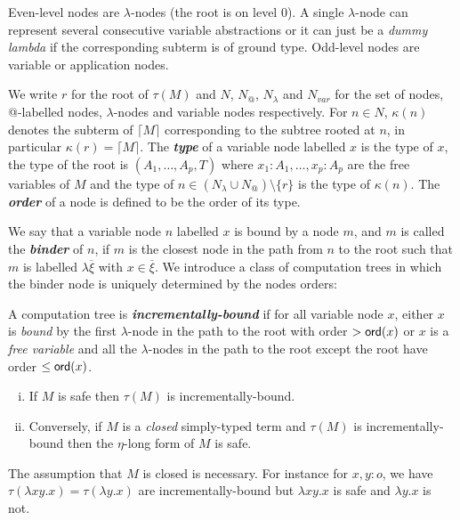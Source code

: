 \documentclass{llncs}
\newcommand\defname[1]{{\bf\em #1}\index{#1}}
\newcommand{\elnf}[1]{\lceil #1\rceil} %
\newcommand\union{\cup}
\begin{document}
Even-level nodes are $\lambda$-nodes (the root is on level 0). A
single $\lambda$-node can represent several consecutive variable
abstractions or it can just be a \emph{dummy lambda} if the
corresponding subterm is of ground type.  Odd-level nodes are variable
or application nodes.

We write $r$ for the root of $\tau(M)$ and $N$, $N_@$, $N_\lambda$ and
$N_{var}$ for the set of nodes, @-labelled nodes, $\lambda$-nodes and
variable nodes respectively.  For $n \in N$, $\kappa(n)$ denotes the
subterm of $\elnf{M}$ corresponding to the subtree rooted at $n$, in
particular $\kappa(r) = \elnf{M}$.  The \defname{type} of a variable
node labelled $x$ is the type of $x$, the type of the root is
$(A_1,\ldots,A_p, T)$ where $x_1:A_1,\ldots, x_p:A_p$ are the free
variables of $M$ and the type of $n\in (N_\lambda \union N_@)
\setminus \{ r \}$ is the type of $\kappa(n)$. The \defname{order} of
a node is defined to be the order of its type.

We say that a variable node $n$ labelled $x$ is bound by a node $m$,
and $m$ is called the \defname{binder} of $n$, if $m$ is the closest
node in the path from $n$ to the root such that $m$ is labelled
$\lambda \overline{\xi}$ with $x\in \overline{\xi}$.
We introduce a class of computation trees in which the binder
node is uniquely determined by the nodes orders:
\begin{definition}\rm
  A computation tree is \defname{incrementally-bound} if for all
  variable node $x$, either $x$ is \emph{bound} by the first
  $\lambda$-node in the path to the root with order $> {\sf ord}(x)$ or $x$
  is a \emph{free variable} and all the $\lambda$-nodes in the path to
  the root except the root have order $\leq {\sf ord}(x)$.
\end{definition}

\begin{proposition} %
\label{prop:safe_imp_incrbound}
\begin{enumerate}[(i)]
\item If $M$ is safe then $\tau(M)$ is incrementally-bound.
\item Conversely, if $M$ is a \emph{closed} simply-typed term and $\tau(M)$
is incrementally-bound then the $\eta$-long form of $M$ is safe.
\end{enumerate}
\end{proposition}

The assumption that $M$ is closed is necessary. For instance for
$x,y:o$, we have $\tau(\lambda x y .x) = \tau(\lambda y . x)$ are
incrementally-bound but $\lambda x y .x$ is safe and $\lambda y . x$
is not.
\end{document}
